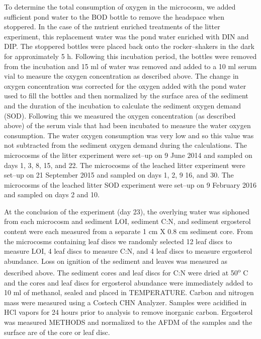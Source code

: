 To determine the total consumption of oxygen in the microcosm, we added sufficient pond water to the BOD bottle to remove the headspace when stoppered. In the case of the nutrient enriched treatments of the litter experiment, this replacement water was the pond water enriched with DIN and DIP. The stoppered bottles were placed back onto the rocker--shakers in the dark for approximately 5 h. Following this incubation period, the bottles were removed from the incubation and 15 ml of water was removed and added to a 10 ml serum vial to measure the oxygen concentration as described above. The change in oxygen concentration was corrected for the oxygen added with the pond water used to fill the bottles and then normalized by the surface area of the sediment and the duration of the incubation to calculate the sediment oxygen demand (SOD). Following this we measured the oxygen concentration (as described above) of the serum vials that had been incubated to measure the water oxygen consumption. The water oxygen consumption was very low and so this value was not subtracted from the sediment oxygen demand during the calculations. The microcosms of the litter experiment were set--up on 9 June 2014 and sampled on days 1, 3, 8, 15, and 22. The microcosms of the leached litter experiment were set--up on 21 September 2015 and sampled on days 1, 2, 9 16, and 30. The microcosms of the leached litter SOD experiment were set--up on 9 February 2016 and sampled on days 2 and 10.
 
At the conclusion of the experiment (day 23), the overlying water was siphoned from each microcosm and sediment LOI, sediment C:N, and sediment ergosterol content were each measured from a separate 1 cm X 0.8 cm sediment core.  From the microcosms containing leaf discs we randomly selected 12 leaf discs to measure LOI, 4 leaf discs to measure C:N, and 4 leaf discs to measure ergosterol abundance. Loss on ignition of the sediment and leaves was measured as described above. The sediment cores and leaf discs for C:N were dried at 50\textsuperscript{o} C and the cores and leaf discs for ergosterol abundance were immediately added to 10 ml of methanol, sealed and placed in TEMPERATURE. Carbon and nitrogen mass were measured using a Costech CHN Analyzer. Samples were acidified in HCl vapors for 24 hours prior to analysis to remove inorganic carbon.  Ergosterol was measured METHODS and normalized to the AFDM of the samples and the surface are of the core or leaf disc.  